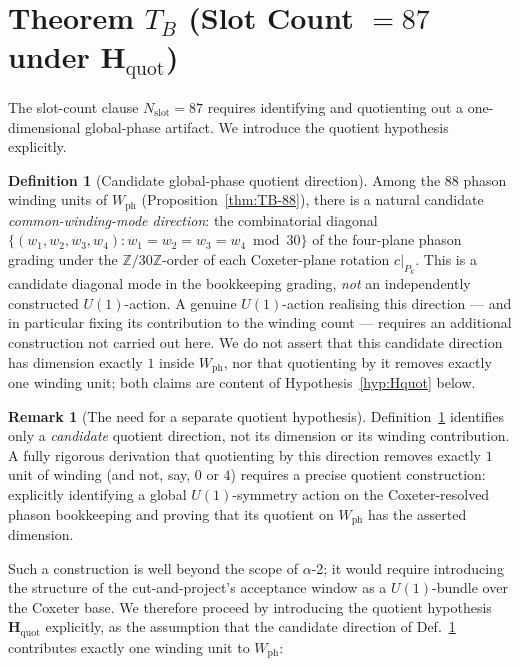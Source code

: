 \documentclass[11pt, a4paper]{amsart}
\theoremstyle{definition}
\newtheorem{definition}[theorem]{Definition}
\newtheorem{remark}[theorem]{Remark}
\newcommand{\Z}{\mathbb{Z}}
\newcommand{\Hquot}{\mathbf{H}_{\mathrm{quot}}}
\newcommand{\Wph}{W_{\mathrm{ph}}}
\newcommand{\Nslot}{N_{\mathrm{slot}}}
\begin{document}
\section{Theorem $T_B$ (Slot Count $= 87$ under $\Hquot$)}
\label{sec:TB-87}

The slot-count clause $\Nslot = 87$ requires identifying and
quotienting out a one-dimensional global-phase artifact. We
introduce the quotient hypothesis explicitly.

\begin{definition}[Candidate global-phase quotient direction]
\label{def:global-phase}
Among the $88$ phason winding units of $\Wph$
(Proposition~\ref{thm:TB-88}), there is a natural candidate
\emph{common-winding-mode direction}: the combinatorial diagonal
$\{(w_1, w_2, w_3, w_4) : w_1 = w_2 = w_3 = w_4 \bmod 30\}$ of
the four-plane phason grading under the $\Z/30\Z$-order of each
Coxeter-plane rotation $c|_{P_k}$. This is a candidate diagonal
mode in the bookkeeping grading, \emph{not} an independently
constructed $U(1)$-action. A genuine $U(1)$-action realising
this direction --- and in particular fixing its contribution to
the winding count --- requires an additional construction not
carried out here. We do not assert that this candidate direction
has dimension exactly $1$ inside $\Wph$, nor that quotienting by
it removes exactly one winding unit; both claims are content of
Hypothesis~\ref{hyp:Hquot} below.
\end{definition}

\begin{remark}[The need for a separate quotient hypothesis]
\label{rmk:Hquot-justif}
Definition~\ref{def:global-phase} identifies only a
\emph{candidate} quotient direction, not its dimension or
its winding contribution. A fully rigorous derivation that
quotienting by this direction removes exactly $1$ unit of
winding (and not, say, $0$ or $4$) requires a precise
quotient construction: explicitly identifying a global
$U(1)$-symmetry action on the Coxeter-resolved phason
bookkeeping and proving that its quotient on $\Wph$ has
the asserted dimension.

Such a construction is well beyond the scope of $\alpha$-2;
it would require introducing the structure of the
cut-and-project's acceptance window as a $U(1)$-bundle over
the Coxeter base. We therefore proceed by introducing the
quotient hypothesis $\Hquot$ explicitly, as the assumption
that the candidate direction of
Def.~\ref{def:global-phase} contributes exactly one
winding unit to $\Wph$:
\end{remark}
\end{document}

